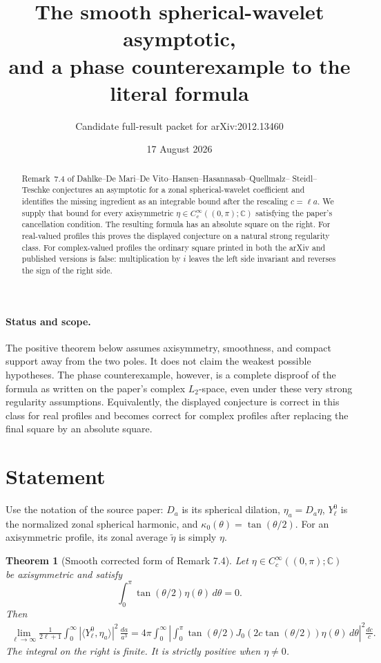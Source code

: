 \documentclass[11pt]{article}
\title{The smooth spherical-wavelet asymptotic,\\
and a phase counterexample to the literal formula}
\author{Candidate full-result packet for arXiv:2012.13460}
\date{17 August 2026}
\newtheorem{theorem}{Theorem}
\newcommand{\C}{\mathbb C}
\begin{document}
\maketitle

\begin{abstract}
Remark~7.4 of Dahlke--De Mari--De Vito--Hansen--Hasannasab--Quellmalz--
Steidl--Teschke conjectures an asymptotic for a zonal spherical-wavelet
coefficient and identifies the missing ingredient as an integrable bound after
the rescaling \(c=\ell a\).  We supply that bound for every axisymmetric
\(\eta\in C_c^\infty((0,\pi);\C)\) satisfying the paper's cancellation
condition.  The resulting formula has an absolute square on the right.  For
real-valued profiles this proves the displayed conjecture on a natural strong
regularity class.  For complex-valued profiles the ordinary square printed in
both the arXiv and published versions is false: multiplication by \(i\) leaves
the left side invariant and reverses the sign of the right side.
\end{abstract}

\paragraph{Status and scope.}
The positive theorem below assumes axisymmetry, smoothness, and compact support
away from the two poles.  It does not claim the weakest possible hypotheses.
The phase counterexample, however, is a complete disproof of the formula as
written on the paper's complex \(L_2\)-space, even under these very strong
regularity assumptions.  Equivalently, the displayed conjecture is correct in
this class for real profiles and becomes correct for complex profiles after
replacing the final square by an absolute square.

\section{Statement}

Use the notation of the source paper: \(D_a\) is its spherical dilation,
\(\eta_a=D_a\eta\), \(Y_\ell^0\) is the normalized zonal spherical harmonic,
and \(\kappa_0(\theta)=\tan(\theta/2)\).  For an axisymmetric profile, its
zonal average \(\widetilde\eta\) is simply \(\eta\).

\begin{theorem}[Smooth corrected form of Remark 7.4]\label{thm:limit}
Let \(\eta\in C_c^\infty((0,\pi);\C)\) be axisymmetric and satisfy
\begin{equation}\label{eq:cancel}
  \int_0^\pi \tan(\theta/2)\eta(\theta)\,d\theta=0.
\end{equation}
Then
\begin{align}\label{eq:limit}
 \lim_{\ell\to\infty}\frac1{2\ell+1}
 \int_0^\infty |\langle Y_\ell^0,\eta_a\rangle|^2\,\frac{da}{a^3}
 =4\pi\int_0^\infty\left|
 \int_0^\pi \tan(\theta/2)J_0\!\left(2c\tan(\theta/2)\right)
 \eta(\theta)\,d\theta\right|^2\frac{dc}{c}.
\end{align}
The integral on the right is finite.  It is strictly positive when
\(\eta\ne0\).
\end{theorem}
\end{document}

